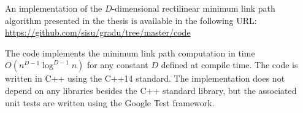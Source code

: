 \documentclass[english,gradu]{tktltiki2018}
\begin{document}
\nocite{*}



\lastpage

\appendices

\pagestyle{empty}


An implementation of the $D$-dimensional rectilinear minimum link path algorithm presented in the thesis is available in the following URL: \\
\url{https://github.com/sisu/gradu/tree/master/code}

The code implements the minimum link path computation in time $O(n^{D-1}\log^{D-1}n)$ for any constant $D$ defined at compile time.
The code is written in C++ using the C++14 standard.
The implementation does not depend on any libraries besides the C++ standard library, but the associated unit tests are written using the Google Test framework.
\end{document}
